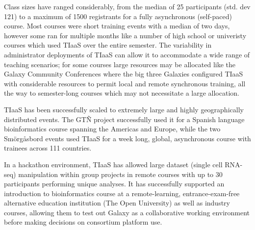 \documentclass[a4paper,num-refs]{oup-contemporary}
\begin{document}
Class sizes have ranged considerably, from the median of 25 participants (std. dev 121) to a maximum of 1500 registrants for a fully asynchronous (self-paced) course. Most courses were short training events with a median of two days, however some ran for multiple months like a number of high school or univeristy courses which used TIaaS over the entire semester. The variability in administrator deployments of TIaaS can allow it to accommodate a wide range of teaching scenarios; for some courses large resources may be allocated like the Galaxy Community Conferences where the big three Galaxies configured TIaaS with considerable resources to permit local and remote synchronous training, all the way to semester-long courses which may not necessitate a large allocation.

TIaaS has been successfully scaled to extremely large and highly geographically distributed events. The GT\~{N} project successfully used it for a Spanish language bioinformatics course spanning the Americas and Europe\cite{Spanscriptomics}, while the two Sm\"{o}rg\r{a}sbord events used TIaaS for a week long, global, asynchronous course with trainees across 111 countries\cite{SmorgBlog}.

In a hackathon environment, TIaaS has allowed large dataset (single cell RNA-seq) manipulation within group projects in remote courses with up to 30 participants performing unique analyses\cite{Bacon_2022}. It has successfully supported an introduction to bioinformatics course at a remote-learning, entrance-exam-free alternative education institution (The Open University) as well as industry courses, allowing them to test out Galaxy as a collaborative working environment before making decisions on consortium platform use.
\end{document}
